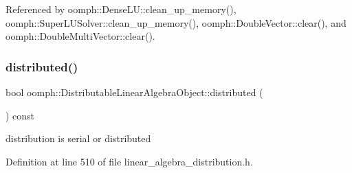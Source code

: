 Referenced by oomph\+::\+Dense\+L\+U\+::clean\+\_\+up\+\_\+memory(), oomph\+::\+Super\+L\+U\+Solver\+::clean\+\_\+up\+\_\+memory(), oomph\+::\+Double\+Vector\+::clear(), and oomph\+::\+Double\+Multi\+Vector\+::clear().

\mbox{\label{classoomph_1_1DistributableLinearAlgebraObject_a5505731e7e73d7e4251c67c7adec6bf5}} 
\subsubsection{\texorpdfstring{distributed()}{distributed()}}
{\footnotesize\ttfamily bool oomph\+::\+Distributable\+Linear\+Algebra\+Object\+::distributed (\begin{DoxyParamCaption}{ }\end{DoxyParamCaption}) const\hspace{0.3cm}{\ttfamily [inline]}}



distribution is serial or distributed 



Definition at line 510 of file linear\+\_\+algebra\+\_\+distribution.\+h.



